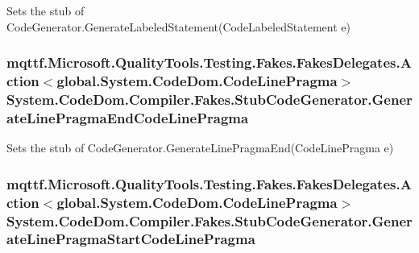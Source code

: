 Sets the stub of Code\-Generator.\-Generate\-Labeled\-Statement(\-Code\-Labeled\-Statement e)

\hypertarget{class_system_1_1_code_dom_1_1_compiler_1_1_fakes_1_1_stub_code_generator_a4f26d649f8a1ab5a982acd0dd726a9a0}{
\subsubsection[{Generate\-Line\-Pragma\-End\-Code\-Line\-Pragma}]{\setlength{\rightskip}{0pt plus 5cm}mqttf.\-Microsoft.\-Quality\-Tools.\-Testing.\-Fakes.\-Fakes\-Delegates.\-Action$<$global.\-System.\-Code\-Dom.\-Code\-Line\-Pragma$>$ System.\-Code\-Dom.\-Compiler.\-Fakes.\-Stub\-Code\-Generator.\-Generate\-Line\-Pragma\-End\-Code\-Line\-Pragma}}\label{class_system_1_1_code_dom_1_1_compiler_1_1_fakes_1_1_stub_code_generator_a4f26d649f8a1ab5a982acd0dd726a9a0}


Sets the stub of Code\-Generator.\-Generate\-Line\-Pragma\-End(\-Code\-Line\-Pragma e)

\hypertarget{class_system_1_1_code_dom_1_1_compiler_1_1_fakes_1_1_stub_code_generator_aa06d0252279284814e1a4b022627c946}{
\subsubsection[{Generate\-Line\-Pragma\-Start\-Code\-Line\-Pragma}]{\setlength{\rightskip}{0pt plus 5cm}mqttf.\-Microsoft.\-Quality\-Tools.\-Testing.\-Fakes.\-Fakes\-Delegates.\-Action$<$global.\-System.\-Code\-Dom.\-Code\-Line\-Pragma$>$ System.\-Code\-Dom.\-Compiler.\-Fakes.\-Stub\-Code\-Generator.\-Generate\-Line\-Pragma\-Start\-Code\-Line\-Pragma}}\label{class_system_1_1_code_dom_1_1_compiler_1_1_fakes_1_1_stub_code_generator_aa06d0252279284814e1a4b022627c946}


